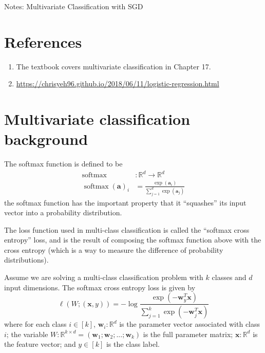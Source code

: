 \documentclass[10pt]{article}
\theoremstyle{definition}
\newcommand{\R}{\mathbb R}
\DeclareMathOperator*{\softmax}{softmax}
\newcommand{\trans}[1]{{#1}^{T}}
\newcommand{\aaa}{\mathbf a}
\newcommand{\w}{\mathbf w}
\newcommand{\x}{\mathbf x}
\begin{document}
\begin{center}
\Huge
Notes: Multivariate Classification with SGD
\end{center}


\section{References}

\begin{enumerate}
    \item
        The textbook covers multivariate classification in Chapter 17.
    \item
        \url{https://chrisyeh96.github.io/2018/06/11/logistic-regression.html}
\end{enumerate}

\section{Multivariate classification background}

The softmax function is defined to be
\begin{align}
    \softmax &: \R^d \to \R^d \\
    \softmax(\aaa)_i &= \frac {\exp(\aaa_i)}{\sum_{j=1}^d \exp(\aaa_j)}
\end{align}
the softmax function has the important property that it ``squashes'' its input vector into a probability distribution.

The loss function used in multi-class classification is called the ``softmax cross entropy'' loss,
and is the result of composing the softmax function above with the cross entropy
(which is a way to measure the difference of probability distributions).

Assume we are solving a multi-class classification problem with $k$ classes and $d$ input dimensions.
The softmax cross entropy loss is given by
\begin{equation}
    \ell(W;(\x,y)) = - \log \frac {\exp(-\trans\w_y \x)}{\sum_{j=1}^k \exp(-\trans \w_j \x)}
\end{equation}
where for each class $i\in[k]$,
$\w_i : \R^d$ is the parameter vector associated with class $i$;
the variable $W : \R^{k \times d} = (\w_1; \w_2; ...; \w_k)$ is the full parameter matrix;
$\x : \R^d$ is the feature vector;
and $y \in [k]$ is the class label.

\newpage
\end{document}
